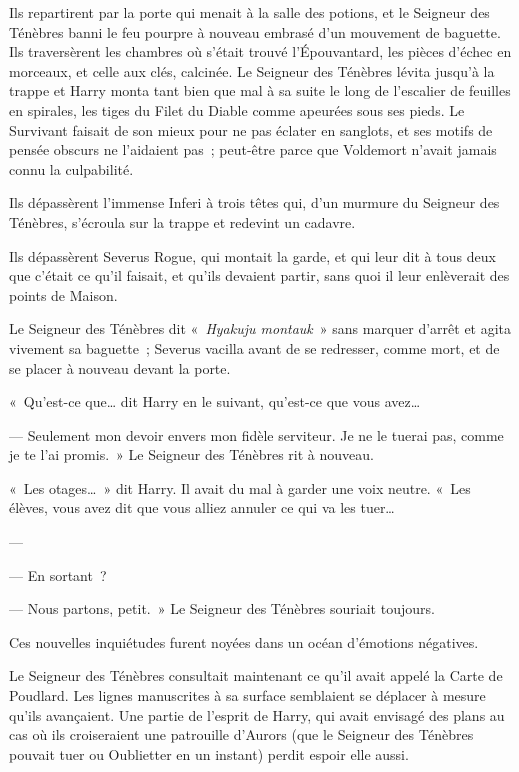 Ils repartirent par la porte qui menait à la salle des potions, et le Seigneur des Ténèbres banni le feu pourpre à nouveau embrasé d'un mouvement de baguette. Ils traversèrent les chambres où s'était trouvé l'Épouvantard, les pièces d'échec en morceaux, et celle aux clés, calcinée. Le Seigneur des Ténèbres lévita jusqu'à la trappe et Harry monta tant bien que mal à sa suite le long de l'escalier de feuilles en spirales, les tiges du Filet du Diable comme apeurées sous ses pieds. Le Survivant faisait de son mieux pour ne pas éclater en sanglots, et ses motifs de pensée obscurs ne l'aidaient pas~; peut-être parce que Voldemort n'avait jamais connu la culpabilité.

Ils dépassèrent l'immense Inferi à trois têtes qui, d'un murmure du Seigneur des Ténèbres, s'écroula sur la trappe et redevint un cadavre.

Ils dépassèrent Severus Rogue, qui montait la garde, et qui leur dit à tous deux que c'était ce qu'il faisait, et qu'ils devaient partir, sans quoi il leur enlèverait des points de Maison.

Le Seigneur des Ténèbres dit «~\emph{Hyakuju montauk}~» sans marquer d'arrêt et agita vivement sa baguette~; Severus vacilla avant de se redresser, comme mort, et de se placer à nouveau devant la porte.

«~Qu'est-ce que… dit Harry en le suivant, qu'est-ce que vous avez…

--- Seulement mon devoir envers mon fidèle serviteur. Je ne le tuerai pas, comme je te l'ai promis.~» Le Seigneur des Ténèbres rit à nouveau.

«~Les otages…~» dit Harry. Il avait du mal à garder une voix neutre. «~Les élèves, vous avez dit que vous alliez annuler ce qui va les tuer…

--- 

--- En sortant~?

--- Nous partons, petit.~» Le Seigneur des Ténèbres souriait toujours.

Ces nouvelles inquiétudes furent noyées dans un océan d'émotions négatives.

Le Seigneur des Ténèbres consultait maintenant ce qu'il avait appelé la Carte de Poudlard. Les lignes manuscrites à sa surface semblaient se déplacer à mesure qu'ils avançaient. Une partie de l'esprit de Harry, qui avait envisagé des plans au cas où ils croiseraient une patrouille d'Aurors (que le Seigneur des Ténèbres pouvait tuer ou Oublietter en un instant) perdit espoir elle aussi.

